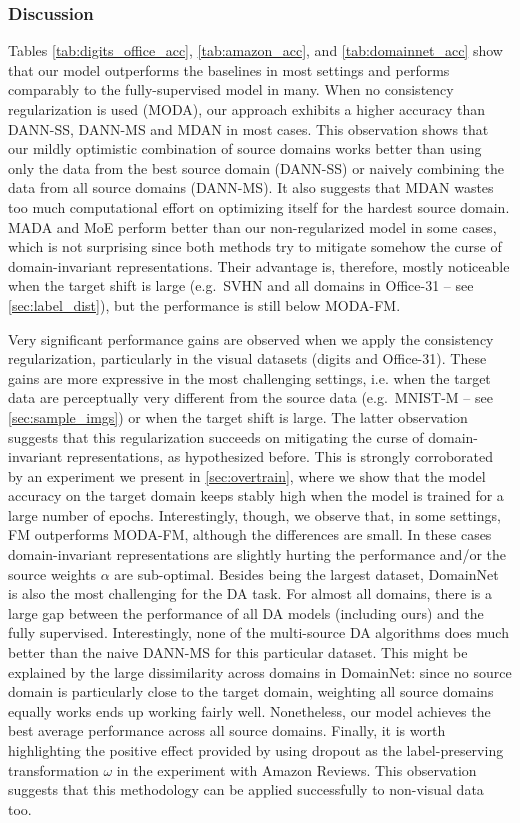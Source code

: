 \subsubsection{Discussion}
Tables \ref{tab:digits_office_acc}, \ref{tab:amazon_acc}, and \ref{tab:domainnet_acc} show that our model outperforms the baselines in most settings and performs comparably to the fully-supervised model in many. When no consistency regularization is used (MODA), our approach exhibits a higher accuracy than DANN-SS, DANN-MS and MDAN in most cases. This observation shows that our mildly optimistic combination of source domains works better than using only the data from the best source domain (DANN-SS) or naively combining the data from all source domains (DANN-MS). It also suggests that MDAN wastes too much computational effort on optimizing itself for the hardest source domain. MADA and MoE perform better than our non-regularized model in some cases, which is not surprising since both methods try to mitigate somehow the curse of domain-invariant representations. Their advantage is, therefore, mostly noticeable when the target shift is large (e.g.\ SVHN and all domains in Office-31 -- see \ref{sec:label_dist}), but the performance is still below MODA-FM.

Very significant performance gains are observed when we apply the consistency regularization, particularly in the visual datasets (digits and Office-31). These gains are more expressive in the most challenging settings, i.e. when the target data are perceptually very different from the source data (e.g.\ MNIST-M -- see \ref{sec:sample_imgs}) or when the target shift is large. The latter observation suggests that this regularization succeeds on mitigating the curse of domain-invariant representations, as hypothesized before. This is strongly corroborated by an experiment we present in \ref{sec:overtrain}, where we show that the model accuracy on the target domain keeps stably high when the model is trained for a large number of epochs. Interestingly, though, we observe that, in some settings, FM outperforms MODA-FM, although the differences are small. In these cases domain-invariant representations are slightly hurting the performance and/or the source weights $\alpha$ are sub-optimal. Besides being the largest dataset, DomainNet is also the most challenging for the DA task. For almost all domains, there is a large gap between the performance of all DA models (including ours) and the fully supervised. Interestingly, none of the multi-source DA algorithms does much better than the naive DANN-MS for this particular dataset. This might be explained by the large dissimilarity across domains in DomainNet: since no source domain is particularly close to the target domain, weighting all source domains equally works ends up working fairly well. Nonetheless, our model achieves the best average performance across all source domains.  Finally, it is worth highlighting the positive effect provided by using dropout as the label-preserving transformation $\omega$ in the experiment with Amazon Reviews. This observation suggests that this methodology can be applied successfully to non-visual data too.

